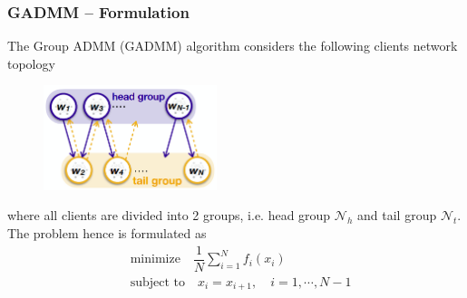 
\begin{frame}
\frametitle{GADMM -- Formulation}

The Group ADMM (GADMM) algorithm \cite{elgabli2020gadmm} considers the following clients network topology
\begin{figure}[H]
    \centering
    \includegraphics[width=0.45\textwidth,keepaspectratio]{images/GADMM.png}
\end{figure}
where all clients are divided into 2 groups, i.e. head group $\mathcal{N}_h$ and tail group $\mathcal{N}_t$. The problem hence is formulated as
\begin{align*}
    & \text{minimize} \quad \dfrac{1}{N} \sum\limits_{i=1}^N f_i(x_i) \\
    & \text{subject to} \quad x_i = x_{i+1}, \quad i=1,\cdots,N-1
\end{align*}

\end{frame}


